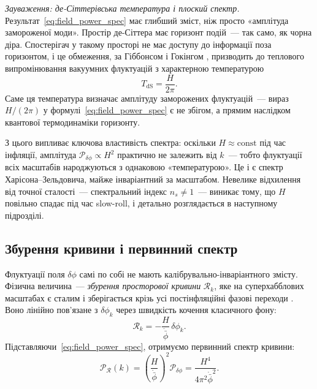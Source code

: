\documentclass[12pt, a4paper]{article}
\begin{document}
\textit{Зауваження: де-Сіттерівська температура і плоский спектр.}
Результат~\eqref{eq:field_power_spec} має глибший зміст, ніж
просто «амплітуда замороженої моди». Простір де-Сіттера має
горизонт подій~--- так само, як чорна діра. Спостерігач у такому
просторі не має доступу до інформації поза горизонтом, і це
обмеження, за Гіббонсом і Гокінгом \cite{gibbons_hawking_1977},
призводить до теплового випромінювання вакуумних флуктуацій з
характерною температурою
\begin{equation*}
  T_\mathrm{dS} = \frac{H}{2\pi}.
\end{equation*}
Саме ця температура визначає амплітуду заморожених флуктуацій~---
вираз $H/(2\pi)$ у формулі~\eqref{eq:field_power_spec} є не
збігом, а прямим наслідком квантової термодинаміки горизонту.

З цього випливає ключова властивість спектра: оскільки $H \approx
\mathrm{const}$ під час інфляції, амплітуда $\mathcal{P}_{\delta\phi}
\propto H^2$ практично не залежить від $k$~--- тобто флуктуації
всіх масштабів народжуються з однаковою «температурою».
Це і є спектр Харісона--Зельдовича, майже інваріантний за
масштабом. Невелике відхилення від точної сталості~---
спектральний індекс $n_s \neq 1$~--- виникає тому, що $H$
повільно спадає під час slow-roll, і детально розглядається
в наступному підрозділі.


\subsection{Збурення кривини і первинний спектр}

Флуктуації поля $\delta\phi$ самі по собі не мають
калібрувально-інваріантного змісту. Фізична величина~---
\emph{збурення просторової кривини} $\mathcal{R}_k$, яке на
суперхабблових масштабах є сталим і зберігається крізь усі
постінфляційні фазові переходи \cite{bardeen_1980}. Воно
лінійно пов'язане з $\delta\phi_k$ через швидкість кочення
класичного фону:
\begin{equation}\label{eq:curvature_perturbation}
  \mathcal{R}_k = -\frac{H}{\dot{\bar{\phi}}}\,\delta\phi_k.
\end{equation}
Підставляючи~\eqref{eq:field_power_spec}, отримуємо первинний
спектр кривини:
\begin{equation}\label{eq:curvature_power_spec}
  \mathcal{P}_{\mathcal{R}}(k)
    = \left(\frac{H}{\dot{\bar{\phi}}}\right)^{\!2}
      \mathcal{P}_{\delta\phi}
    = \frac{H^4}{4\pi^2\dot{\bar{\phi}}^2}.
\end{equation}
\end{document}
